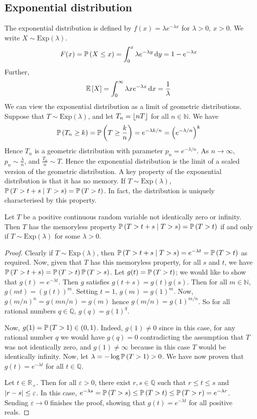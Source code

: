 \subsection{Exponential distribution}
The exponential distribution is defined by \(f(x) = \lambda e^{-\lambda x}\) for \(\lambda > 0\), \(x > 0\).
We write \(X \sim \mathrm{Exp}(\lambda)\).
\[
	F(x) = \prob{X \leq x} = \int_0^x \lambda e^{-\lambda y} \dd{y} = 1 - e^{-\lambda x}
\]
Further,
\[
	\expect{X} = \int_0^\infty \lambda x e^{-\lambda x} \dd{x} = \frac{1}{\lambda}
\]
We can view the exponential distribution as a limit of geometric distributions.
Suppose that \(T \sim \mathrm{Exp}(\lambda)\), and let \(T_n = \floor*{nT}\) for all \(n \in \mathbb N\).
We have
\[
	\prob{T_n \geq k} = \prob{T \geq \frac{k}{n}} = e^{-\lambda k / n} = \left( e^{-\lambda/n} \right)^k
\]
Hence \(T_n\) is a geometric distribution with parameter \(p_n = e^{-\lambda/n}\).
As \(n \to \infty\), \(p_n \sim \frac{\lambda}{n}\), and \(\frac{T_n}{n} \sim T\).
Hence the exponential distribution is the limit of a scaled version of the geometric distribution.
A key property of the exponential distribution is that it has no memory.
If \(T \sim \mathrm{Exp}(\lambda)\), \(\prob{T > t + s \mid T > s} = \prob{T > t}\).
In fact, the distribution is uniquely characterised by this property.
\begin{proposition}
	Let \(T\) be a positive continuous random variable not identically zero or infinity.
	Then \(T\) has the memoryless property \(\prob{T > t + s \mid T > s} = \prob{T > t}\) if and only if \(T \sim \mathrm{Exp}(\lambda)\) for some \(\lambda > 0\).
\end{proposition}
\begin{proof}
	Clearly if \(T \sim \mathrm{Exp}(\lambda)\), then \(\prob{T > t + s \mid T > s} = e^{-\lambda t} = \prob{T > t}\) as required.
	Now, given that \(T\) has this memoryless property, for all \(s\) and \(t\), we have \(\prob{T > t + s} = \prob{T > t} \prob{T > s}\).
	Let \(g(t) = \prob{T > t}\); we would like to show that \(g(t) = e^{-\lambda t}\).
	Then \(g\) satisfies \(g(t+s) = g(t)g(s)\).
	Then for all \(m \in \mathbb N\), \(g(mt) = (g(t))^m\).
	Setting \(t=1\), \(g(m) = g(1)^m\).
	Now, \(g(m/n)^n = g(mn/n) = g(m)\) hence \(g(m/n) = g(1)^{m/n}\).
	So for all rational numbers \(q \in \mathbb Q\), \(g(q) = g(1)^q\).

	Now, \(g(1) = \prob{T > 1} \in (0, 1)\).
	Indeed, \(g(1) \neq 0\) since in this case, for any rational number \(q\) we would have \(g(q) = 0\) contradicting the assumption that \(T\) was not identically zero, and \(g(1) \neq \infty\) because in this case \(T\) would be identically infinity.
	Now, let \(\lambda = -\log\prob{T > 1} > 0\).
	We have now proven that \(g(t) = e^{-\lambda t}\) for all \(t\in\mathbb Q\).

	Let \(t \in \mathbb R_+\).
	Then for all \(\varepsilon > 0\), there exist \(r, s \in \mathbb Q\) such that \(r \leq t \leq s\) and \(\abs{r - s} \leq \varepsilon\).
	In this case, \(e^{-\lambda s} = \prob{T > s} \leq \prob{T > t} \leq \prob{T > r} = e^{-\lambda r}\).
	Sending \(\varepsilon \to 0\) finishes the proof, showing that \(g(t) = e^{-\lambda t}\) for all positive reals.
\end{proof}

